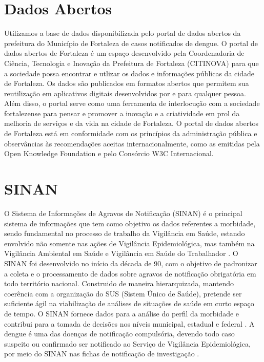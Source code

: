 \documentclass[
	12pt,				%
	openright,			%
	oneside,	
	a4paper,				%
	english,				%
	brazil				%
]{abntex2/abntex2} %
\begin{document}
	\section{Dados Abertos}

	Utilizamos a base de dados disponibilizada pelo portal de dados abertos da prefeitura do Município de Fortaleza de casos notificados de dengue. O portal de dados abertos de Fortaleza é um espaço desenvolvido pela Coordenadoria de Ciência, Tecnologia e Inovação da Prefeitura de Fortaleza (CITINOVA) para que a sociedade possa encontrar e utlizar os dados e informações públicas da cidade de Fortaleza. Os dados são publicados em formatos abertos que permitem sua reutilização em aplicativos digitais desenvolvidos por e para qualquer pessoa. Além disso, o portal serve como uma ferramenta de interlocução com a sociedade fortalezense para pensar e promover  a inovação e a criatividade em prol da melhoria de serviços e da vida na cidade de Fortaleza. O portal de dados abertos de Fortaleza está em conformidade com os princípios da administração pública e observâncias às recomendações aceitas internacionalmente, como as emitidas pela Open Knowledge Foundation e pelo Consórcio W3C Internacional.
		
		
	\section{SINAN}
	
	O Sistema de Informações de Agravos de Notificação (SINAN) é o principal sistema de informações que tem como objetivo os dados referentes a morbidade, sendo fundamental no processo de trabalho da Vigilância em Saúde, estando envolvido não somente nas ações de Vigilância Epidemiológica, mas também na Vigilância Ambiental em Saúde e Vigilância em Saúde do Trabalhador \cite{conass:2015}.
	O SINAN foi desenvolvido no início da década de 90, com o objetivo de padronizar a coleta e o processamento de dados sobre agravos de notificação obrigatória em todo território nacional. Construido de maneira hierarquizada, mantendo coerência com a organização do SUS (Sistem Único de Saúde), pretende ser suficiente ágil na viabilização de análises de situações de saúde em curto espaço de tempo. O SINAN fornece dados para a análise do perfil da morbidade e contribui para a tomada de decisões nos níveis municipal, estadual e federal \cite{saude:2008}.
	A dengue é uma das doenças de notificação compulsória, devendo todo caso suspeito ou confirmado ser notificado ao Serviço de Vigilância Epidemiológica, por meio do SINAN nas fichas de notificação de investigação \cite{saude:2008}.
	
\end{document}
